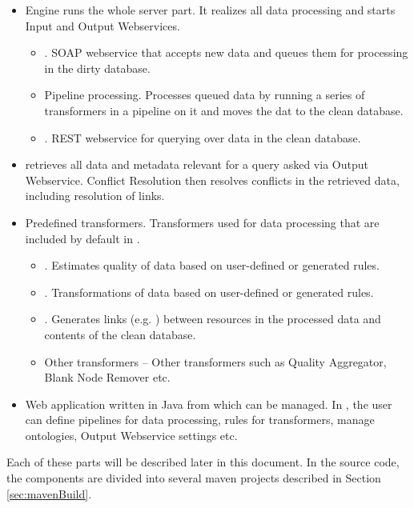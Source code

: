 \begin{itemize}
	\item {}
		Engine runs the whole server part. It realizes all data processing and starts Input and Output Webservices.

		\begin{itemize}
			\item {}. SOAP webservice that accepts new data and queues them for processing in the dirty database.
			\item Pipeline processing. Processes queued data by running a series of transformers in a pipeline on it and moves the dat to the clean database.
			\item {}. REST webservice for querying over data in the clean database.
		\end{itemize}
	\item {}
		\QE retrieves all data and metadata relevant for a query asked via Output Webservice. Conflict Resolution then resolves conflicts in the retrieved data, including resolution of  links.
	\item Predefined transformers.
		Transformers used for data processing that are included by default in \odcs.
		\begin{itemize}
			\item {}. Estimates quality of data based on user-defined or generated rules.
			\item {}. Transformations of data based on user-defined or generated rules.
			\item {}. Generates links (e.g. ) between resources in the processed data and contents of the clean database.
			\item Other transformers -- Other transformers such as Quality Aggregator, Blank Node Remover etc.
		\end{itemize}
	\item {}
		Web application written in Java from which \odcs can be managed. In \FE, the user can define pipelines for data processing, rules for transformers, manage ontologies, Output Webservice settings etc.
\end{itemize}

Each of these parts will be described later in this document. In the source code, the components are divided into several maven projects described in Section \ref{sec:mavenBuild}.

